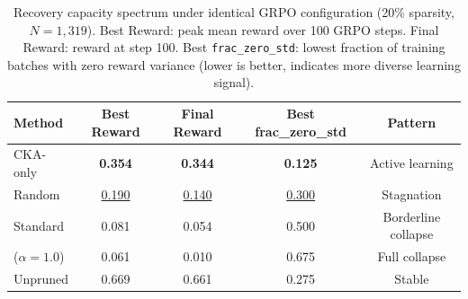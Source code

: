 \begin{table}[t]
\centering
\small
\caption{Recovery capacity spectrum under identical GRPO configuration (20\% sparsity, $N{=}1{,}319$). Best Reward: peak mean reward over 100 GRPO steps. Final Reward: reward at step 100. Best \texttt{frac\_zero\_std}: lowest fraction of training batches with zero reward variance (lower is better, indicates more diverse learning signal).}
\label{tab:recovery_gradient}
\begin{tabular}{lcccc}
\toprule
Method & Best Reward & Final Reward & Best frac\_zero\_std & Pattern \\
\midrule
CKA-only & \textbf{0.354} & \textbf{0.344} & \textbf{0.125} & Active learning \\
Random & \underline{0.190} & \underline{0.140} & \underline{0.300} & Stagnation \\
Standard & 0.081 & 0.054 & 0.500 & Borderline collapse \\
\rasp{} ($\alpha{=}1.0$) & 0.061 & 0.010 & 0.675 & Full collapse \\
\midrule
Unpruned & 0.669 & 0.661 & 0.275 & Stable \\
\bottomrule
\end{tabular}
\end{table}
